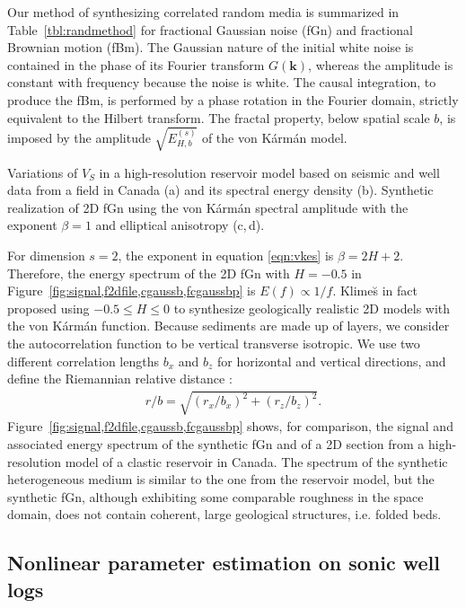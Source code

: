 Our method of synthesizing correlated random media is summarized in Table~\ref{tbl:randmethod}
for fractional Gaussian noise (fGn) and fractional Brownian motion (fBm).
The Gaussian nature of the initial white noise is contained in the phase of its Fourier transform $G(\mathbf{k})$, 
whereas the amplitude is constant with frequency  because the noise is white.
The causal integration, to produce the fBm, is performed by a phase rotation in the Fourier domain, strictly equivalent to the Hilbert transform.
The fractal property, below spatial scale $b$, is imposed by the amplitude $\sqrt{E^{(s)}_{H,b}}$ of the von K\'arm\'an model.

{Variations of $V_S$ in a high-resolution reservoir model based 
on seismic and well data from a field in Canada
(a) and its spectral energy density (b).
Synthetic realization of 2D fGn
using the von K\'arm\'an spectral amplitude with the exponent $\beta=1$ 
and elliptical anisotropy (c,\,d).}

For dimension $s=2$, the exponent in equation \ref{eqn:vkes} is $\beta=2H+2$.
Therefore, the energy spectrum of the 2D fGn with $H=-0.5$ in Figure~\ref{fig:signal,f2dfile,cgaussb,fcgaussbp}
is $E(f)\propto 1/f$.
Klime\u{s}  in fact proposed using $-0.5\leq H\leq 0$ to synthesize geologically realistic 2D models
with the von K\'arm\'an function.
Because sediments are made up of layers, we consider the autocorrelation function to be vertical transverse isotropic.
We use two different correlation lengths $b_x$ and $b_z$ for horizontal and vertical directions,
and define the Riemannian relative distance \cite[]{Goff_J88}:
\begin{eqnarray}
r/b=\sqrt{(r_x/b_x)^2+(r_z/b_z)^2}.
\end{eqnarray}
Figure~\ref{fig:signal,f2dfile,cgaussb,fcgaussbp}
shows, for comparison, the signal and associated energy spectrum of the synthetic fGn 
and of a 2D section from a high-resolution model of a clastic reservoir in Canada.
The spectrum of the synthetic heterogeneous medium is similar to the one from the reservoir model,
but the synthetic fGn, although exhibiting some comparable roughness in the space domain,
does not contain coherent, large geological structures, i.e. folded beds.


\subsection{Nonlinear parameter estimation on sonic well logs}


